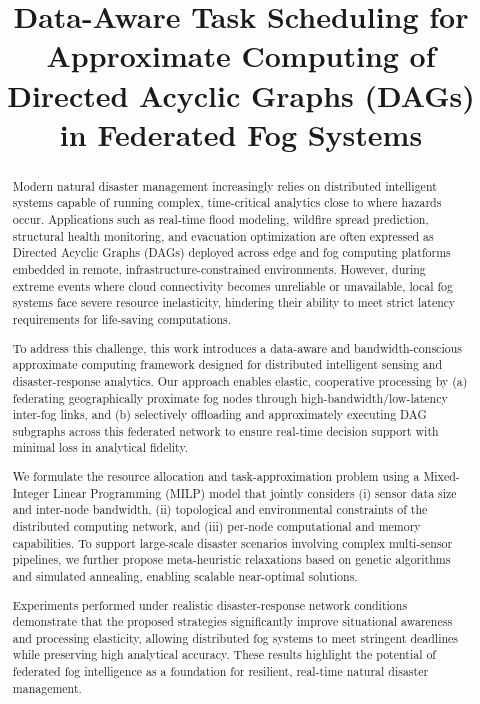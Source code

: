\documentclass[conference]{IEEEtran}
\title{Data-Aware Task Scheduling for Approximate Computing of Directed Acyclic Graphs (DAGs) in Federated Fog Systems}
\date{}
\begin{document}
\maketitle

\begin{abstract}
Modern natural disaster management increasingly relies on distributed intelligent systems capable of running complex, time-critical analytics close to where hazards occur. Applications such as real-time flood modeling, wildfire spread prediction, structural health monitoring, and evacuation optimization are often expressed as Directed Acyclic Graphs (DAGs) deployed across edge and fog computing platforms embedded in remote, infrastructure-constrained environments. However, during extreme events where cloud connectivity becomes unreliable or unavailable, local fog systems face severe resource inelasticity, hindering their ability to meet strict latency requirements for life-saving computations.

To address this challenge, this work introduces a data-aware and bandwidth-conscious approximate computing framework designed for distributed intelligent sensing and disaster-response analytics. Our approach enables elastic, cooperative processing by (a) federating geographically proximate fog nodes through high-bandwidth/low-latency inter-fog links, and (b) selectively offloading and approximately executing DAG subgraphs across this federated network to ensure real-time decision support with minimal loss in analytical fidelity.

We formulate the resource allocation and task-approximation problem using a Mixed-Integer Linear Programming (MILP) model that jointly considers (i) sensor data size and inter-node bandwidth, (ii) topological and environmental constraints of the distributed computing network, and (iii) per-node computational and memory capabilities. To support large-scale disaster scenarios involving complex multi-sensor pipelines, we further propose meta-heuristic relaxations based on genetic algorithms and simulated annealing, enabling scalable near-optimal solutions.

Experiments performed under realistic disaster-response network conditions demonstrate that the proposed strategies significantly improve situational awareness and processing elasticity, allowing distributed fog systems to meet stringent deadlines while preserving high analytical accuracy. These results highlight the potential of federated fog intelligence as a foundation for resilient, real-time natural disaster management.
\end{abstract}
\end{document}
